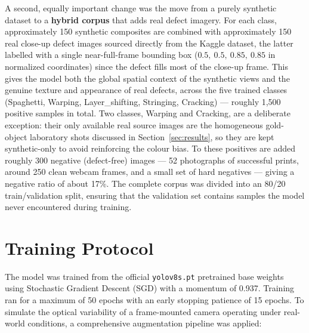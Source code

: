 \documentclass[english, Lau, oneside]{sapthesis}
\begin{document}
A second, equally important change was the move from a purely synthetic dataset to a \textbf{hybrid corpus} that adds real defect imagery. For each class, approximately 150 synthetic composites are combined with approximately 150 real close-up defect images sourced directly from the Kaggle dataset, the latter labelled with a single near-full-frame bounding box ($0.5,\ 0.5,\ 0.85,\ 0.85$ in normalized coordinates) since the defect fills most of the close-up frame. This gives the model both the global spatial context of the synthetic views and the genuine texture and appearance of real defects, across the five trained classes (Spaghetti, Warping, Layer\_shifting, Stringing, Cracking) --- roughly 1{,}500 positive samples in total. Two classes, Warping and Cracking, are a deliberate exception: their only available real source images are the homogeneous gold-object laboratory shots discussed in Section~\ref{sec:results}, so they are kept synthetic-only to avoid reinforcing the colour bias. To these positives are added roughly 300 negative (defect-free) images --- 52 photographs of successful prints, around 250 clean webcam frames, and a small set of hard negatives --- giving a negative ratio of about 17\%. The complete corpus was divided into an 80/20 train/validation split, ensuring that the validation set contains samples the model never encountered during training.

\section{Training Protocol}
\label{sec:training}

The model was trained from the official \texttt{yolov8s.pt} pretrained base weights using Stochastic Gradient Descent (SGD) with a momentum of 0.937. Training ran for a maximum of 50 epochs with an early stopping patience of 15 epochs. To simulate the optical variability of a frame-mounted camera operating under real-world conditions, a comprehensive augmentation pipeline was applied:
\end{document}
